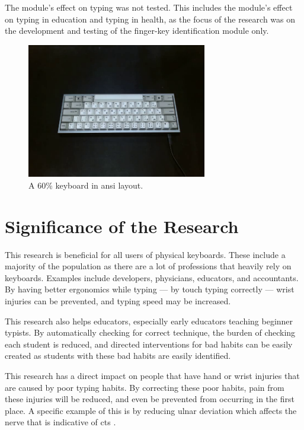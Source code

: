 \documentclass{report}
\begin{document}
The module's effect on typing was not tested. This includes the module's effect
on typing in education and typing in health, as the focus of the research was on
the development and testing of the finger-key identification module only.

\begin{figure}[H]
	\centering
	\includegraphics[width=0.7\textwidth]{60.png}
	\caption{A 60\% keyboard in \ac{ansi} layout.}
	\label{fig:60}
	\centering
\end{figure}


\section{Significance of the Research}
This research is beneficial for all users of physical keyboards. These include a
majority of the population as there are a lot of professions that heavily rely
on keyboards. Examples include developers, physicians, educators, and
accountants. By having better ergonomics while typing --- by touch typing
correctly --- wrist injuries can be prevented, and typing speed may be
increased.

This research also helps educators, especially early educators teaching beginner
typists. By automatically checking for correct technique, the burden of checking
each student is reduced, and directed interventions for bad habits can be easily
created as students with these bad habits are easily identified.

This research has a direct impact on people that have hand or wrist injuries
that are caused by poor typing habits. By correcting these poor habits, pain
from these injuries will be reduced, and even be prevented from occurring in the
first place. A specific example of this is by reducing ulnar deviation which
affects the nerve that is indicative of \ac{cts} \parencite{toosi2015}.
\end{document}
